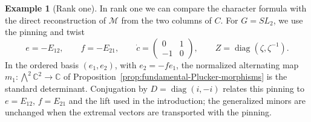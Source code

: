 \documentclass[11pt,leqno]{amsart}
\numberwithin{equation}{section}
\theoremstyle{plain}
\theoremstyle{definition}
\theoremstyle{plain}
\theoremstyle{definition}
\newtheorem{example}[theorem]{Example}
\theoremstyle{remark}
\begin{document}
\begin{example}[Rank one]\label{sec:rank-one-T}\label{rem:A1-differential-YQ}
In rank one we can compare the character formula with the direct reconstruction of $\mathscr M$ from the two columns of $C$. For $G=SL_2$, we use the pinning and twist
\begin{equation}\label{eq:rank-one-pinning}
 e=-E_{12},\qquad f=-E_{21},\qquad
 \dot c=\begin{pmatrix}0&1\\-1&0\end{pmatrix},\qquad
 Z=\operatorname{diag}(\zeta,\zeta^{-1}).
\end{equation}
In the ordered basis $(e_1,e_2)$, with $e_2=-fe_1$, the normalized alternating map $m_1:\bigwedge^2\mathbb C^2\to\mathbb C$ of Proposition~\ref{prop:fundamental-Plucker-morphisms} is the standard determinant.  Conjugation by $D=\operatorname{diag}(i,-i)$ relates this pinning to $e=E_{12}$, $f=E_{21}$ and the lift used in the introduction; the generalized minors are unchanged when the extremal vectors are transported with the pinning.


\end{example}
\end{document}
